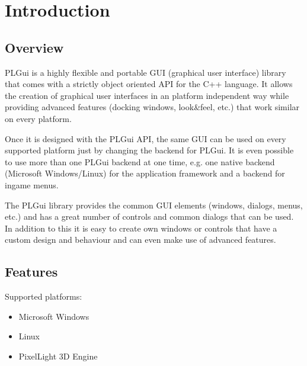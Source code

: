 \chapter{Introduction}




\section{Overview}
PLGui is a highly flexible and portable GUI (graphical user interface) library that comes with a strictly object oriented API for the C++ language. It allows the creation of graphical user interfaces in an platform independent way while providing advanced features (docking windows, look\&feel, etc.) that work similar on every platform.

Once it is designed with the PLGui API, the same GUI can be used on every supported platform just by changing the backend for PLGui. It is even possible to use more than one PLGui backend at one time, e.g. one native backend (Microsoft Windows/Linux) for the application framework and a backend for ingame menus.

The PLGui library provides the common GUI elements (windows, dialogs, menus, etc.) and has a great number of controls and common dialogs that can be used. In addition to this it is easy to create own windows or controls that have a custom design and behaviour and can even make use of advanced features.




\section{Features}
Supported platforms:
\begin{itemize}
\item Microsoft Windows
\item Linux
\item PixelLight 3D Engine
\end{itemize}
